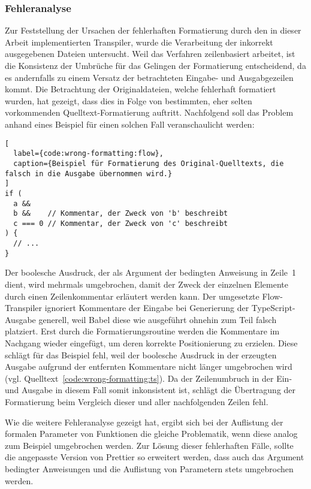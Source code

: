 \subsubsection{Fehleranalyse}

Zur Feststellung der Ursachen der fehlerhaften Formatierung durch den in dieser Arbeit implementierten Transpiler, wurde die Verarbeitung der inkorrekt ausgegebenen Dateien untersucht. Weil das Verfahren zeilenbasiert arbeitet, ist die Konsistenz der Umbrüche für das Gelingen der Formatierung entscheidend, da es andernfalls zu einem Versatz der betrachteten Eingabe- und Ausgabgezeilen kommt. Die Betrachtung der Originaldateien, welche fehlerhaft formatiert wurden, hat gezeigt, dass dies in Folge von bestimmten, eher selten vorkommenden Quelltext-Formatierung auftritt. Nachfolgend soll das Problem anhand eines Beispiel für einen solchen Fall veranschaulicht werden:

\begin{lstlisting}[
  label={code:wrong-formatting:flow},
  caption={Beispiel für Formatierung des Original-Quelltexts, die falsch in die Ausgabe übernommen wird.}
]
if (
  a &&
  b &&    // Kommentar, der Zweck von 'b' beschreibt
  c === 0 // Kommentar, der Zweck von 'c' beschreibt
) {
  // ...
}
\end{lstlisting}

Der boolesche Ausdruck, der als Argument der bedingten Anweisung in Zeile~1 dient, wird mehrmals umgebrochen, damit der Zweck der einzelnen Elemente durch einen Zeilenkommentar erläutert werden kann. Der umgesetzte Flow-Transpiler ignoriert Kommentare der Eingabe bei Generierung der TypeScript-Ausgabe generell, weil Babel diese wie ausgeführt ohnehin zum Teil falsch platziert. Erst durch die Formatierungsroutine werden die Kommentare im Nachgang wieder eingefügt, um deren korrekte Positionierung zu erzielen. Diese schlägt für das Beispiel fehl, weil der boolesche Ausdruck in der erzeugten Ausgabe aufgrund der entfernten Kommentare nicht länger umgebrochen wird (vgl. Quelltext~\ref{code:wrong-formatting:ts}). Da der Zeilenumbruch in der Ein- und Ausgabe in diesem Fall somit inkonsistent ist, schlägt die Übertragung der Formatierung beim Vergleich dieser und aller nachfolgenden Zeilen fehl.

Wie die weitere Fehleranalyse gezeigt hat, ergibt sich bei der Auflistung der formalen Parameter von Funktionen die gleiche Problematik, wenn diese analog zum Beispiel umgebrochen werden. Zur Lösung dieser fehlerhaften Fälle, sollte die angepasste Version von Prettier so erweitert werden, dass auch das Argument bedingter Anweisungen und die Auflistung  von Parametern stets umgebrochen werden.

